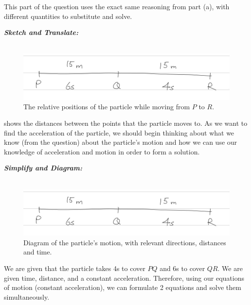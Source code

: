 \begin{subquestions}
	
\subquestion

\begin{subsubquestions}
This part of the question uses the exact same reasoning from part (a), with different quantities to substitute and solve.

\subsubquestion
\textbf{\textit{Sketch and Translate:}} \\ \\
\begin{figure}[H]
	\begin{center}
		\includegraphics[scale=0.5]{../2010/figures/2010q5-2}
		\caption{\label{2010:q5:Move4} The relative positions of the particle while moving from $P$ to $R$.}
	\end{center}
\end{figure}
 shows the distances between the points that the particle moves to. As we want to find the acceleration of the particle, we should begin thinking about what we know (from the question) about the particle's motion and how we can use our knowledge of acceleration and motion in order to form a solution.





\textbf{\textit{Simplify and Diagram:}} \\ \\
\begin{figure}[H]
	\begin{center}
		\includegraphics[scale=0.5]{../2010/figures/2010q5-2}
		\caption{\label{2010:q5:Move5} Diagram of the particle's motion, with relevant directions, distances and time.}
	\end{center}
\end{figure}
We are given that the particle takes 4s to cover $PQ$ and 6s to cover $QR$. We are given time, distance, and a constant acceleration. Therefore, using our equations of motion (constant acceleration), we can formulate 2 equations and solve them simultaneously.





\end{subsubquestions}
\end{subquestions}
